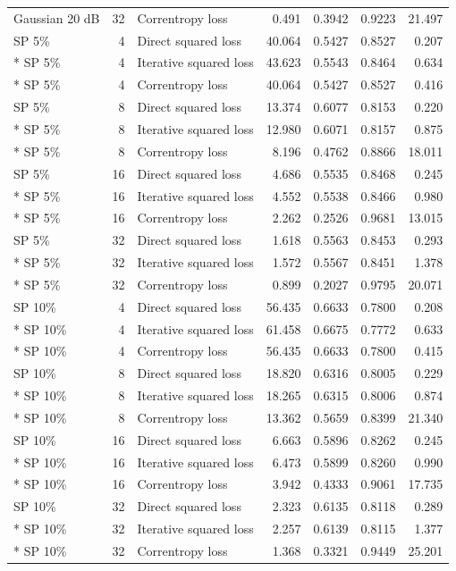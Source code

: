 \begin{longtable}{@{}lr lrrrr@{}}
Gaussian 20 dB & 32 & Correntropy loss & 0.491 & 0.3942 & 0.9223 & 21.497 \\
\addlinespace[2.4pt]
\midrule
SP 5\% & 4 & Direct squared loss & 40.064 & 0.5427 & 0.8527 & 0.207 \\*
SP 5\% & 4 & Iterative squared loss & 43.623 & 0.5543 & 0.8464 & 0.634 \\*
SP 5\% & 4 & Correntropy loss & 40.064 & 0.5427 & 0.8527 & 0.416 \\
\addlinespace[1.2pt]
SP 5\% & 8 & Direct squared loss & 13.374 & 0.6077 & 0.8153 & 0.220 \\*
SP 5\% & 8 & Iterative squared loss & 12.980 & 0.6071 & 0.8157 & 0.875 \\*
SP 5\% & 8 & Correntropy loss & 8.196 & 0.4762 & 0.8866 & 18.011 \\
\addlinespace[1.2pt]
SP 5\% & 16 & Direct squared loss & 4.686 & 0.5535 & 0.8468 & 0.245 \\*
SP 5\% & 16 & Iterative squared loss & 4.552 & 0.5538 & 0.8466 & 0.980 \\*
SP 5\% & 16 & Correntropy loss & 2.262 & 0.2526 & 0.9681 & 13.015 \\
\addlinespace[1.2pt]
SP 5\% & 32 & Direct squared loss & 1.618 & 0.5563 & 0.8453 & 0.293 \\*
SP 5\% & 32 & Iterative squared loss & 1.572 & 0.5567 & 0.8451 & 1.378 \\*
SP 5\% & 32 & Correntropy loss & 0.899 & 0.2027 & 0.9795 & 20.071 \\
\addlinespace[2.4pt]
\midrule
SP 10\% & 4 & Direct squared loss & 56.435 & 0.6633 & 0.7800 & 0.208 \\*
SP 10\% & 4 & Iterative squared loss & 61.458 & 0.6675 & 0.7772 & 0.633 \\*
SP 10\% & 4 & Correntropy loss & 56.435 & 0.6633 & 0.7800 & 0.415 \\
\addlinespace[1.2pt]
SP 10\% & 8 & Direct squared loss & 18.820 & 0.6316 & 0.8005 & 0.229 \\*
SP 10\% & 8 & Iterative squared loss & 18.265 & 0.6315 & 0.8006 & 0.874 \\*
SP 10\% & 8 & Correntropy loss & 13.362 & 0.5659 & 0.8399 & 21.340 \\
\addlinespace[1.2pt]
SP 10\% & 16 & Direct squared loss & 6.663 & 0.5896 & 0.8262 & 0.245 \\*
SP 10\% & 16 & Iterative squared loss & 6.473 & 0.5899 & 0.8260 & 0.990 \\*
SP 10\% & 16 & Correntropy loss & 3.942 & 0.4333 & 0.9061 & 17.735 \\
\addlinespace[1.2pt]
SP 10\% & 32 & Direct squared loss & 2.323 & 0.6135 & 0.8118 & 0.289 \\*
SP 10\% & 32 & Iterative squared loss & 2.257 & 0.6139 & 0.8115 & 1.377 \\*
SP 10\% & 32 & Correntropy loss & 1.368 & 0.3321 & 0.9449 & 25.201 \\
\end{longtable}
